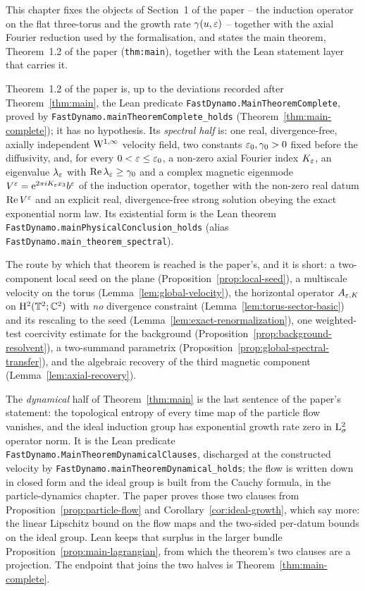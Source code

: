 This chapter fixes the objects of Section~1 of the paper -- the induction
operator on the flat three-torus and the growth rate $\gamma(u,\varepsilon)$ --
together with the axial Fourier reduction used by the formalisation, and states
the main theorem, Theorem~1.2 of the paper (\texttt{thm:main}), together with
the Lean statement layer that carries it.

Theorem~1.2 of the paper is, up to the deviations recorded after Theorem~\ref{thm:main}, the
Lean predicate \texttt{FastDynamo.MainTheoremComplete}, proved by \texttt{FastDynamo.mainTheoremComplete\_holds}
(Theorem~\ref{thm:main-complete}); it has no hypothesis.  Its \emph{spectral half} is: one
real, divergence-free, axially independent
$\mathrm{W}^{1,\infty}$ velocity field, two constants $\varepsilon_0,\gamma_0>0$ fixed before
the diffusivity, and, for every $0<\varepsilon\leq\varepsilon_0$, a non-zero axial Fourier
index $K_\varepsilon$, an eigenvalue $\lambda_\varepsilon$ with $\operatorname{Re}\lambda_\varepsilon\geq\gamma_0$
and a complex magnetic eigenmode
$V^\varepsilon=\mathrm{e}^{2\pi iK_\varepsilon x_3}b^\varepsilon$ of the induction operator, together with
the non-zero real datum $\operatorname{Re} V^\varepsilon$ and an explicit real, divergence-free
strong solution obeying the exact exponential norm law.  Its existential form is the Lean
theorem \texttt{FastDynamo.mainPhysicalConclusion\_holds} (alias
\texttt{FastDynamo.main\_theorem\_spectral}).

The route by which that theorem is reached is the paper's, and it is short:
a two-component local seed on the plane (Proposition~\ref{prop:local-seed}), a multiscale
velocity on the torus (Lemma~\ref{lem:global-velocity}), the horizontal operator
$A_{\varepsilon,K}$ on $\mathrm{H}^2(\mathbb{T}^2;\mathbb{C}^2)$ with \emph{no} divergence constraint
(Lemma~\ref{lem:torus-sector-basic}) and its rescaling to the seed
(Lemma~\ref{lem:exact-renormalization}), one weighted-test coercivity estimate for the
background (Proposition~\ref{prop:background-resolvent}), a two-summand parametrix
(Proposition~\ref{prop:global-spectral-transfer}), and the algebraic recovery of the third
magnetic component (Lemma~\ref{lem:axial-recovery}).

The \emph{dynamical} half of Theorem~\ref{thm:main} is the last sentence of the paper's
statement: the topological entropy of every time map of the particle flow vanishes, and the
ideal induction group has exponential growth rate zero in $\mathrm{L}^2_\sigma$ operator norm.  It is
the Lean predicate \texttt{FastDynamo.MainTheoremDynamicalClauses}, discharged at the
constructed velocity by \texttt{FastDynamo.mainTheoremDynamical\_holds}; the flow is written
down in closed form and the ideal group is built from the Cauchy formula, in the
particle-dynamics chapter.  The paper proves those two clauses
from Proposition~\ref{prop:particle-flow} and Corollary~\ref{cor:ideal-growth}, which say
more: the linear Lipschitz bound on the flow maps and the two-sided per-datum bounds on the
ideal group.  Lean keeps that surplus in the larger bundle
Proposition~\ref{prop:main-lagrangian}, from which the theorem's two clauses are a projection.
The endpoint that joins the two halves is Theorem~\ref{thm:main-complete}.

